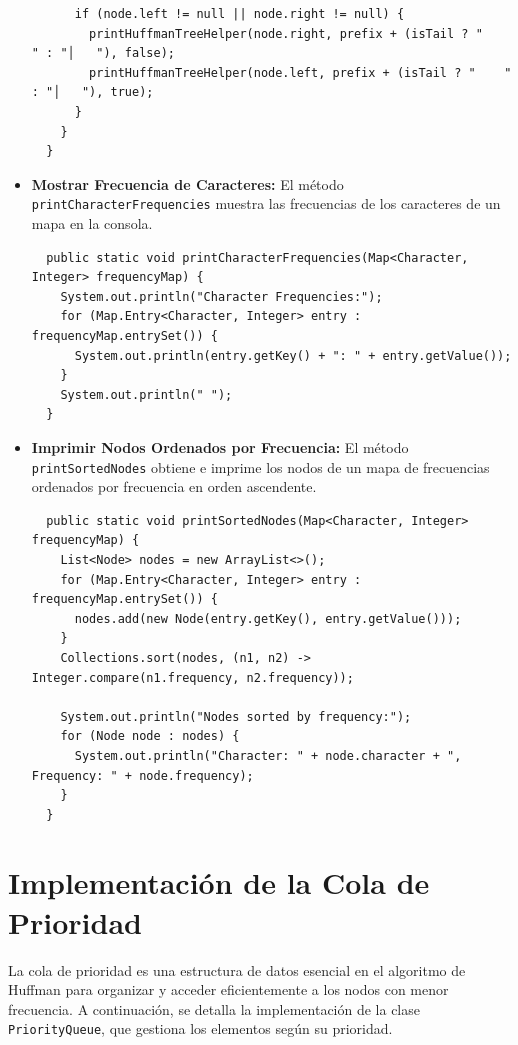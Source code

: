 \documentclass[10pt, a4paper]{article}
\newcommand{\mj}[1]{\texttt{#1}}
\begin{document}
\begin{itemize}
\begin{verbatim}
      if (node.left != null || node.right != null) {
        printHuffmanTreeHelper(node.right, prefix + (isTail ? "    " : "│   "), false);
        printHuffmanTreeHelper(node.left, prefix + (isTail ? "    " : "│   "), true);
      }
    }
  }
\end{verbatim}
  \item \textbf{Mostrar Frecuencia de Caracteres:} El método \mj{printCharacterFrequencies} muestra las frecuencias de los caracteres de un mapa en la consola.
\begin{verbatim}
  public static void printCharacterFrequencies(Map<Character, Integer> frequencyMap) {
    System.out.println("Character Frequencies:");
    for (Map.Entry<Character, Integer> entry : frequencyMap.entrySet()) {
      System.out.println(entry.getKey() + ": " + entry.getValue());
    }
    System.out.println(" ");
  }
\end{verbatim}
  \item \textbf{Imprimir Nodos Ordenados por Frecuencia:} El método \mj{printSortedNodes} obtiene e imprime los nodos de un mapa de frecuencias ordenados por frecuencia en orden ascendente.
\begin{verbatim}
  public static void printSortedNodes(Map<Character, Integer> frequencyMap) {
    List<Node> nodes = new ArrayList<>();
    for (Map.Entry<Character, Integer> entry : frequencyMap.entrySet()) {
      nodes.add(new Node(entry.getKey(), entry.getValue()));
    }
    Collections.sort(nodes, (n1, n2) -> Integer.compare(n1.frequency, n2.frequency));
    
    System.out.println("Nodes sorted by frequency:");
    for (Node node : nodes) {
      System.out.println("Character: " + node.character + ", Frequency: " + node.frequency);
    }
  }
\end{verbatim}

\end{itemize}

\section{Implementación de la Cola de Prioridad}

La cola de prioridad es una estructura de datos esencial en el algoritmo de Huffman para organizar y acceder eficientemente a los nodos con menor frecuencia. A continuación, se detalla la implementación de la clase \mj{PriorityQueue}, que gestiona los elementos según su prioridad.
\end{document}
